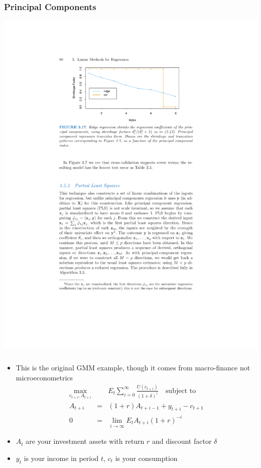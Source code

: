 \begin{frame}
\frametitle{Principal Components}
\begin{center}
\includegraphics[width=\textwidth]{./resources/pcrridge}
\end{center}
\end{frame}



\begin{frame}
\frametitle{\citet{hansen1982generalized}}
\begin{itemize}
\item This is the original GMM example, though it comes from macro-finance not microeconometrics
\begin{eqnarray*}
\max_{c_{t+i},A_{t+i}}&& E_t \sum_{i=0}^{\infty} \frac{U(c_{t+i})}{(1+\delta)^i} \quad \mbox{subject to } \\
A_{t+i} &=& (1+r) A_{t+i-1} + y_{t+i} - c_{t+1} \\
0&=&\lim_{i \rightarrow \infty} E_t A_{t+i} (1+r)^{-i} 
\end{eqnarray*}
\item $A_t$ are your investment assets with return $r$ and discount factor $\delta$
\item $y_t$ is your income in period $t$, $c_t$ is your consumption 
\end{itemize}
\end{frame}

